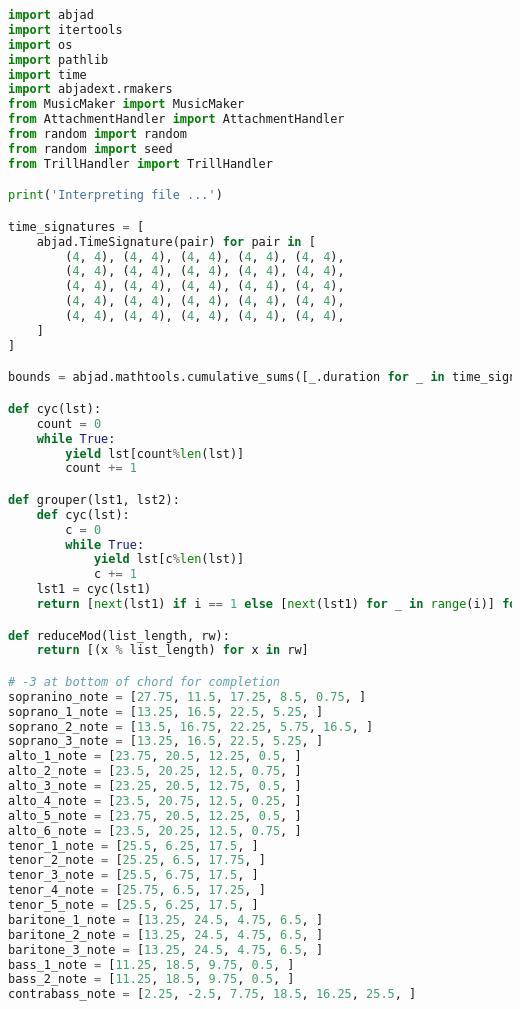 \begin{lstlisting}[language=Python, caption=Invocation Source Code]
import abjad
import itertools
import os
import pathlib
import time
import abjadext.rmakers
from MusicMaker import MusicMaker
from AttachmentHandler import AttachmentHandler
from random import random
from random import seed
from TrillHandler import TrillHandler

print('Interpreting file ...')

time_signatures = [
    abjad.TimeSignature(pair) for pair in [
        (4, 4), (4, 4), (4, 4), (4, 4), (4, 4),
        (4, 4), (4, 4), (4, 4), (4, 4), (4, 4),
        (4, 4), (4, 4), (4, 4), (4, 4), (4, 4),
        (4, 4), (4, 4), (4, 4), (4, 4), (4, 4),
        (4, 4), (4, 4), (4, 4), (4, 4), (4, 4),
    ]
]

bounds = abjad.mathtools.cumulative_sums([_.duration for _ in time_signatures])

def cyc(lst):
    count = 0
    while True:
        yield lst[count%len(lst)]
        count += 1

def grouper(lst1, lst2):
    def cyc(lst):
        c = 0
        while True:
            yield lst[c%len(lst)]
            c += 1
    lst1 = cyc(lst1)
    return [next(lst1) if i == 1 else [next(lst1) for _ in range(i)] for i in lst2]

def reduceMod(list_length, rw):
    return [(x % list_length) for x in rw]

# -3 at bottom of chord for completion
sopranino_note = [27.75, 11.5, 17.25, 8.5, 0.75, ]
soprano_1_note = [13.25, 16.5, 22.5, 5.25, ]
soprano_2_note = [13.5, 16.75, 22.25, 5.75, 16.5, ]
soprano_3_note = [13.25, 16.5, 22.5, 5.25, ]
alto_1_note = [23.75, 20.5, 12.25, 0.5, ]
alto_2_note = [23.5, 20.25, 12.5, 0.75, ]
alto_3_note = [23.25, 20.5, 12.75, 0.5, ]
alto_4_note = [23.5, 20.75, 12.5, 0.25, ]
alto_5_note = [23.75, 20.5, 12.25, 0.5, ]
alto_6_note = [23.5, 20.25, 12.5, 0.75, ]
tenor_1_note = [25.5, 6.25, 17.5, ]
tenor_2_note = [25.25, 6.5, 17.75, ]
tenor_3_note = [25.5, 6.75, 17.5, ]
tenor_4_note = [25.75, 6.5, 17.25, ]
tenor_5_note = [25.5, 6.25, 17.5, ]
baritone_1_note = [13.25, 24.5, 4.75, 6.5, ]
baritone_2_note = [13.25, 24.5, 4.75, 6.5, ]
baritone_3_note = [13.25, 24.5, 4.75, 6.5, ]
bass_1_note = [11.25, 18.5, 9.75, 0.5, ]
bass_2_note = [11.25, 18.5, 9.75, 0.5, ]
contrabass_note = [2.25, -2.5, 7.75, 18.5, 16.25, 25.5, ]


\end{lstlisting}
